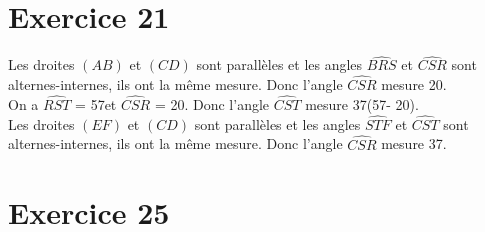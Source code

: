 \documentclass[12pt,a4paper]{article}
\begin{document}
\newpage

\section*{Exercice 21}


Les droites $(AB)$ et $(CD)$ sont parallèles et les angles $\widehat{BRS}$ et $\widehat{CSR}$ sont alternes-internes, ils ont la même mesure. Donc l'angle $\widehat{CSR}$ mesure 20\degree .\\


On a $\widehat{RST}$ = 57\degree et $\widehat{CSR}$ = 20\degree . Donc l'angle $\widehat{CST}$ mesure 37\degree  (57\degree  - 20\degree ).\\


Les droites $(EF)$ et $(CD)$ sont parallèles et les angles $\widehat{STF}$ et $\widehat{CST}$ sont alternes-internes, ils ont la même mesure. Donc l'angle $\widehat{CSR}$ mesure 37\degree .


\section*{Exercice 25}
\end{document}
